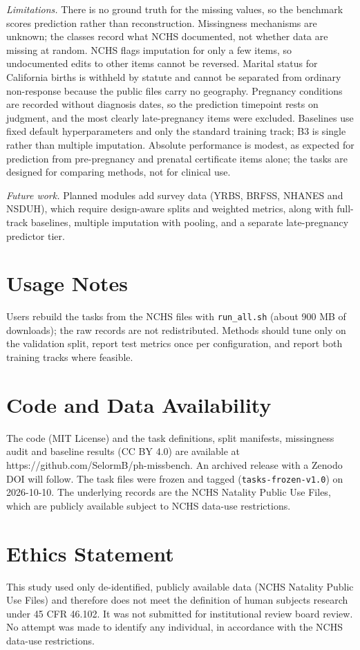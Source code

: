 \documentclass[journal]{IEEEtran}
\begin{document}
\textit{Limitations.} There is no ground truth for the missing values, so the benchmark scores prediction rather than reconstruction. Missingness mechanisms are unknown; the classes record what NCHS documented, not whether data are missing at random. NCHS flags imputation for only a few items, so undocumented edits to other items cannot be reversed. Marital status for California births is withheld by statute and cannot be separated from ordinary non-response because the public files carry no geography. Pregnancy conditions are recorded without diagnosis dates, so the prediction timepoint rests on judgment, and the most clearly late-pregnancy items were excluded. Baselines use fixed default hyperparameters and only the standard training track; B3 is single rather than multiple imputation. Absolute performance is modest, as expected for prediction from pre-pregnancy and prenatal certificate items alone; the tasks are designed for comparing methods, not for clinical use.

\textit{Future work.} Planned modules add survey data (YRBS, BRFSS, NHANES and NSDUH), which require design-aware splits and weighted metrics, along with full-track baselines, multiple imputation with pooling, and a separate late-pregnancy predictor tier.

\section{Usage Notes}

Users rebuild the tasks from the NCHS files with \texttt{run\_all.sh} (about 900 MB of downloads); the raw records are not redistributed. Methods should tune only on the validation split, report test metrics once per configuration, and report both training tracks where feasible.

\section*{Code and Data Availability}

The code (MIT License) and the task definitions, split manifests, missingness audit and baseline results (CC BY 4.0) are available at https://github.com/SelormB/ph-missbench. An archived release with a Zenodo DOI will follow. The task files were frozen and tagged (\texttt{tasks-frozen-v1.0}) on 2026-10-10. The underlying records are the NCHS Natality Public Use Files, which are publicly available subject to NCHS data-use restrictions.

\section*{Ethics Statement}
This study used only de-identified, publicly available data (NCHS Natality Public Use Files) and therefore does not meet the definition of human subjects research under 45 CFR 46.102. It was not submitted for institutional review board review. No attempt was made to identify any individual, in accordance with the NCHS data-use restrictions.
\end{document}
